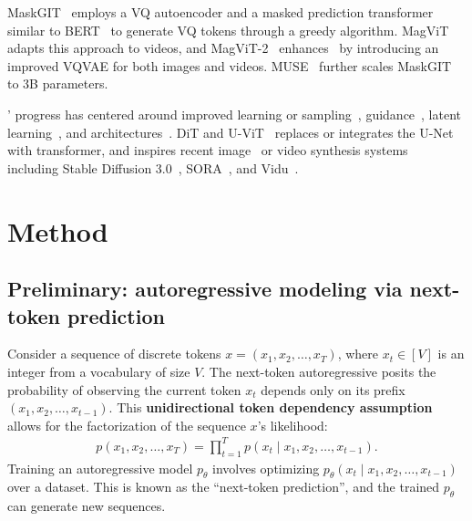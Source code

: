  MaskGIT~\cite{maskgit} employs a VQ autoencoder and a masked prediction transformer similar to BERT~\cite{bert, beit, mae} to generate VQ tokens through a greedy algorithm.
MagViT~\cite{magvit} adapts this approach to videos, and MagViT-2~\cite{magvit2} enhances~\cite{maskgit,magvit} by introducing an improved VQVAE for both images and videos.
MUSE~\cite{muse} further scales MaskGIT to 3B parameters.

' progress has centered around improved learning or sampling~\cite{scorebased,ddim, dpm-solver,dpmpp,bao2022analytic}, guidance~\cite{cfg, glide}, latent learning~\cite{ldm}, and architectures~\cite{cdm, dit, imagen, raphael}.
DiT and U-ViT~\cite{dit,bao2023all} replaces or integrates the U-Net with transformer, and inspires recent image~\cite{chen2023pixart,chen2024pixart_sigma} or video synthesis systems~\cite{bar2024lumiere,gupta2023photorealistic} including Stable Diffusion 3.0~\cite{stable-diffusion3}, SORA~\cite{sora}, and Vidu~\cite{bao2024vidu}.

\section{Method} \label{sec:method}

\vspace{-3pt}
\subsection{Preliminary: autoregressive modeling via next-token prediction} \label{sec:ar}
\vspace{-2pt}

Consider a sequence of discrete tokens $x = (x_1, x_2, \dots, x_T)$, where $x_t \in [V]$ is an integer from a vocabulary of size $V$.
The next-token autoregressive posits the probability of observing the current token $x_t$ depends only on its prefix $(x_1, x_2, \dots, x_{t-1})$.
This \textbf{unidirectional token dependency assumption} allows for the factorization of the sequence $x$'s likelihood:
\begin{align}
    p(x_1, x_2, \dots, x_T) = \prod_{t=1}^{T} p(x_t \mid x_1, x_2, \dots, x_{t-1}). \label{eq:ar}
\end{align}
Training an autoregressive model $p_\theta$ involves optimizing $p_\theta(x_t \mid x_1, x_2, \dots, x_{t-1})$ over a dataset.
This is known as the ``next-token prediction'', and the trained $p_\theta$ can generate new sequences.

